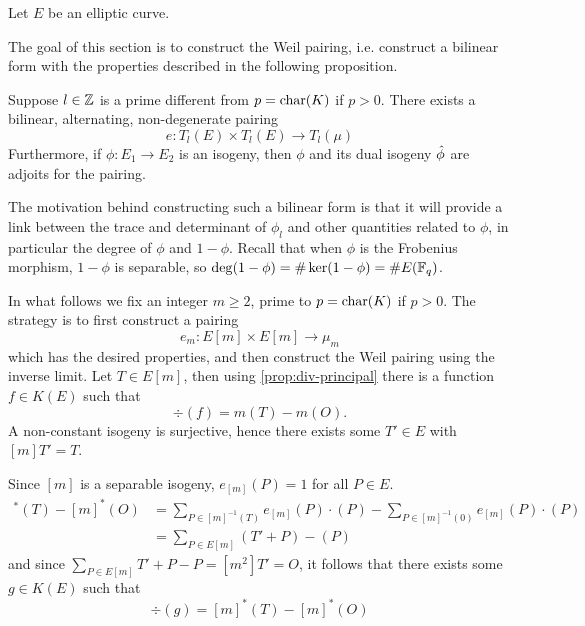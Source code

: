 Let $E$ be an elliptic curve. 


The goal of this section is to construct the Weil pairing, i.e. construct
a bilinear form with the properties described in the following proposition.
\begin{proposition}
	\label{prop:weil-pairing}
	Suppose $l \in \mathbb{Z}$ is a prime different from $p = \operatorname{char}(K)$ if $p > 0$.
	There exists a bilinear, alternating, non-degenerate pairing
	\begin{equation*}
		e: T_l(E) \times T_l(E) \to T_l(\mu)	
	\end{equation*}
	Furthermore, if $\phi: E_1 \to E_2$ is an isogeny, then $\phi$ and its
	dual isogeny $\Hat\phi$ are adjoits for the pairing.
\end{proposition}
The motivation behind constructing such a bilinear form is that it will provide
a link between the trace and determinant of $\phi_l$ and other quantities
related to $\phi$, in particular the degree of $\phi$ and $1 - \phi$.
Recall that when $\phi$ is the Frobenius morphism, $1 - \phi$ is separable,
so $\deg(1 - \phi) = \#\ker(1 - \phi) = \#E(\mathbb{F}_q)$.

In what follows we fix an integer $m \geq 2$,
prime to $p = \operatorname{char}(K)$ if $p > 0$.
The strategy is to first construct a pairing
\begin{equation*}
	e_m: E[m] \times E[m] \to \mu_m
\end{equation*}
which has the desired properties,
and then construct the Weil pairing using the inverse limit.
Let $T \in E[m]$, then using \ref{prop:div-principal}
there is a function $f \in K(E)$ such that
\begin{equation*}
	\div(f) = m(T) - m(O).
\end{equation*}
A non-constant isogeny is surjective, hence there exists some $T' \in E$
with $[m]T' = T$. 

Since $[m]$ is a separable isogeny, $e_{[m]}(P) = 1$ for all $P \in E$.
\begin{align*}
	[m]^*(T) - [m]^*(O) &= \sum_{P \in [m]^{-1}(T)}e_{[m]}(P)\cdot(P) -
	\sum_{P \in [m]^{-1}(0)}e_{[m]}(P)\cdot(P)\\
	&= \sum_{P \in E[m]}(T' + P) - (P)
\end{align*}
and since $\sum_{P \in E[m]} T' + P - P = [m^2]T' = O$, it follows that there
exists some $g \in K(E)$ such that
\begin{equation*}
	\div(g) = [m]^*(T) - [m]^*(O)
\end{equation*}

